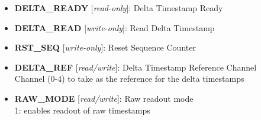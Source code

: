 \vspace{12pt}
\noindent
{}

\begin{itemize}
\item \begin{small}
{\bf 
DELTA\_READY
} [\emph{read-only}]: Delta Timestamp Ready
\end{small}
\item \begin{small}
{\bf 
DELTA\_READ
} [\emph{write-only}]: Read Delta Timestamp
\end{small}
\item \begin{small}
{\bf 
RST\_SEQ
} [\emph{write-only}]: Reset Sequence Counter
\end{small}
\item \begin{small}
{\bf 
DELTA\_REF
} [\emph{read/write}]: Delta Timestamp Reference Channel
\\
Channel (0-4) to take as the reference for the delta timestamps
\end{small}
\item \begin{small}
{\bf 
RAW\_MODE
} [\emph{read/write}]: Raw readout mode
\\
1: enables readout of raw timestamps
\end{small}
\end{itemize}
